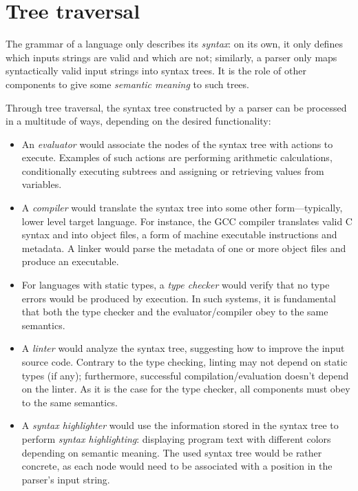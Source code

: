 \documentclass[UdineBachThesis,american,11pt]{PhdThesis}
\begin{document}
  \section{Tree traversal}

  The grammar of a language only describes its \emph{syntax}: on its own, it
  only defines which inputs strings are valid and which are not; similarly, a
  parser only maps syntactically valid input strings into syntax trees. It is
  the role of other components to give some \emph{semantic meaning} to such
  trees.

  Through tree traversal, the syntax tree constructed by a parser can be
  processed in a multitude of ways, depending on the desired functionality:

  \begin{itemize}
    \item An \emph{evaluator} would associate the nodes of the syntax tree with
    actions to execute. Examples of such actions are performing arithmetic
    calculations, conditionally executing subtrees and assigning or retrieving
    values from variables.

    \item A \emph{compiler} would translate the syntax tree into some other
    form---typically, lower level target language. For instance, the GCC
    compiler translates valid C syntax and into object files, a form of machine
    executable instructions and metadata. A linker would parse the metadata of
    one or more object files and produce an executable.

    \item For languages with static types, a \emph{type checker} would verify
    that no type errors would be produced by execution. In such systems, it is
    fundamental that both the type checker and the evaluator/compiler obey to
    the same semantics.

    \item A \emph{linter} would analyze the syntax tree, suggesting how to
    improve the input source code. Contrary to the type checking, linting may
    not depend on static types (if any); furthermore, successful
    compilation/evaluation doesn't depend on the linter. As it is the case for
    the type checker, all components must obey to the same semantics.

    \item A \emph{syntax highlighter} would use the information stored in the
    syntax tree to perform \emph{syntax highlighting}: displaying program text
    with different colors depending on semantic meaning. The used syntax tree
    would be rather concrete, as each node would need to be associated with a
    position in the parser's input string.
  \end{itemize}
\end{document}

